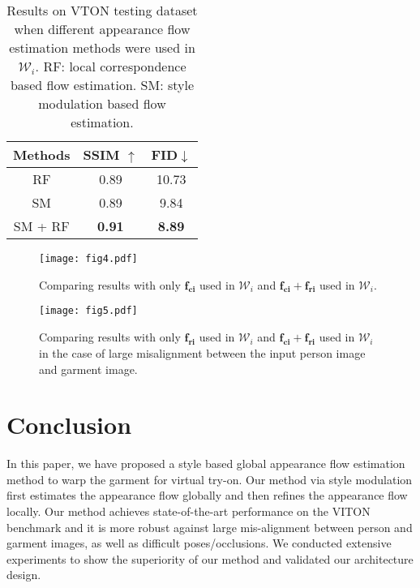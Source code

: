 \documentclass[10pt,twocolumn,letterpaper]{article}
\begin{document}
\begin{table}[ht]
    \centering
    \begin{tabular}{c|c|c}
    \toprule
         Methods & SSIM $\uparrow$& FID$\downarrow$\\
         \midrule
         RF& 0.89& 10.73\\
         SM& 0.89& 9.84\\
         \midrule
         SM + RF & \textbf{0.91}& \textbf{8.89}\\
         \bottomrule
    \end{tabular}

    \caption{Results on VTON testing dataset  when different appearance flow estimation methods were used in $\mathcal{W}_{i}$. RF: local correspondence based flow estimation. SM: style modulation based flow estimation.}
    \label{tab:tab4}
    \vspace{-0.4cm}
\end{table}

\begin{figure}[h!]
    \centering
    \texttt{[image: fig4.pdf]}
    \vspace{-0.7cm}
    \caption{Comparing results with only $\mathbf{f_{ci}}$ used in $\mathcal{W}_{i}$ and $\mathbf{f_{ci}}+ \mathbf{f_{ri}}$ used in $\mathcal{W}_{i}$.}
    \vspace{-0.2cm}
    \label{fig:fig4}
\end{figure}

\begin{figure}[h!]
    \centering
    \texttt{[image: fig5.pdf]}
    \vspace{-0.5cm}
    \caption{Comparing results with only $\mathbf{f_{ri}}$ used in $\mathcal{W}_{i}$ and $\mathbf{f_{ci}}+ \mathbf{f_{ri}}$ used in $\mathcal{W}_{i}$ in the case of large misalignment between the input person image and garment image.}
    \label{fig:fig5}
\end{figure}


\section{Conclusion}
In this paper, we have proposed a style based global appearance flow estimation method to warp the garment for virtual try-on. Our method via style modulation first estimates the appearance flow globally and then refines the appearance flow locally. Our method achieves state-of-the-art performance on the VITON benchmark and it is more robust against large mis-alignment between person and garment images, as well as difficult poses/occlusions. We conducted extensive experiments to show the superiority of our method and validated our architecture design.

{\small


}
\end{document}
